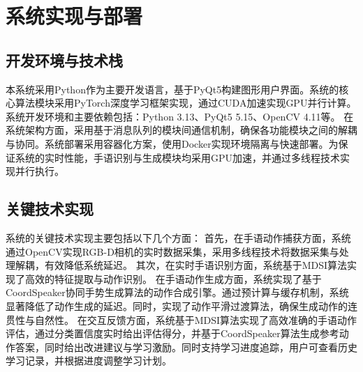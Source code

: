 \section{系统实现与部署}
\subsection{开发环境与技术栈}
本系统采用Python作为主要开发语言，基于PyQt5构建图形用户界面。系统的核心算法模块采用PyTorch深度学习框架实现，通过CUDA加速实现GPU并行计算。系统开发环境和主要依赖包括：Python 3.13、PyQt5 5.15、OpenCV 4.11等。
在系统架构方面，采用基于消息队列的模块间通信机制，确保各功能模块之间的解耦与协同。系统部署采用容器化方案，使用Docker实现环境隔离与快速部署。为保证系统的实时性能，手语识别与生成模块均采用GPU加速，并通过多线程技术实现并行执行。

\subsection{关键技术实现}
系统的关键技术实现主要包括以下几个方面：
首先，在手语动作捕获方面，系统通过OpenCV实现RGB-D相机的实时数据采集，采用多线程技术将数据采集与处理解耦，有效降低系统延迟。
其次，在实时手语识别方面，系统基于MDSI算法实现了高效的特征提取与动作识别。
在手语动作生成方面，系统实现了基于CoordSpeaker协同手势生成算法的动作合成引擎。通过预计算与缓存机制，系统显著降低了动作生成的延迟。同时，实现了动作平滑过渡算法，确保生成动作的连贯性与自然性。
在交互反馈方面，系统基于MDSI算法实现了高效准确的手语动作评估，通过分类置信度实时给出评估得分，并基于CoordSpeaker算法生成参考动作答案，同时给出改进建议与学习激励。同时支持学习进度追踪，用户可查看历史学习记录，并根据进度调整学习计划。%



